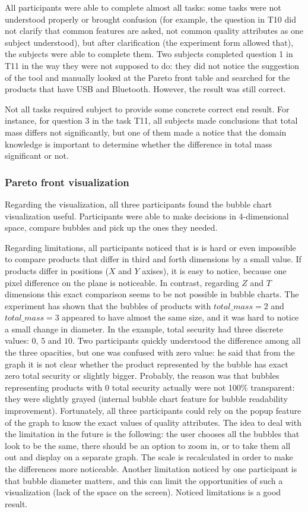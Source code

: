 \documentclass{acm_proc_article-sp}
\begin{document}
All participants were able to complete almost all tasks: some tasks were not understood properly or brought confusion (for example, the question in T10 did not clarify that common features are asked, not common quality attributes as one subject understood), but after clarification (the experiment form allowed that), the subjects were able to complete them. Two subjects completed question 1 in T11 in the way they were not supposed to do: they did not notice the suggestion of the tool and manually looked at the Pareto front table and searched for the products that have USB and Bluetooth. However, the result was still correct.

Not all tasks required subject to provide some concrete correct end result. For instance, for question 3 in the task T11, all subjects made conclusions that total mass differs not significantly, but one of them made a notice that the domain knowledge is important to determine whether the difference in total mass significant or not.

\subsubsection{Pareto front visualization}

Regarding the visualization, all three participants found the bubble chart visualization useful. Participants were able to make decisions in 4-dimensional space, compare bubbles and pick up the ones they needed.

Regarding limitations, all participants noticed that is is hard or even impossible to compare products that differ in third and forth dimensions by a small value. If products differ in positions ($X$ and $Y$ axises), it is easy to notice, because one pixel difference on the plane is noticeable. In contrast, regarding $Z$ and $T$ dimensions this exact comparison seems to be not possible in bubble charts. The experiment has shown that the bubbles of products with $total\_mass = 2$ and $total\_mass = 3$ appeared to have almost the same size, and it was hard to notice a small change in diameter. In the example, total security had three discrete values: $0$, $5$ and $10$. Two participants quickly understood the difference among all the three opacities, but one was confused with zero value: he said that from the graph it is not clear whether the product represented by the bubble has exact zero total security or slightly bigger. Probably, the reason was that bubbles representing products with 0 total security actually were not 100\% transparent: they were slightly grayed (internal bubble chart feature for bubble readability improvement).  Fortunately, all three participants could rely on the popup feature of the graph to know the exact values of quality attributes. The idea to deal with the limitation in the future is the following: the user chooses all the bubbles that look to be the same, there should be an option to zoom in, or to take them all out and display on a separate graph. The scale is recalculated in order to make the differences more noticeable. Another limitation noticed by one participant is that bubble diameter matters, and this can limit the opportunities of such a visualization (lack of the space on the screen). Noticed limitations is a good result.
\end{document}
